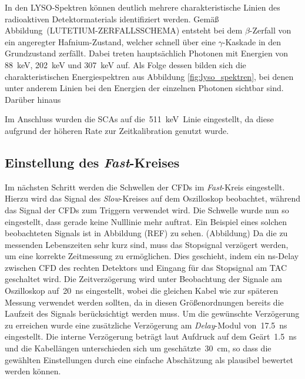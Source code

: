 \documentclass[11pt, a4paper]{article}
\numberwithin{equation}{section}
\newcommand{\korr}[1]{{\color{red}(#1)}}
\begin{document}
In den LYSO-Spektren können deutlich mehrere charakteristische Linien des radioaktiven Detektormaterials identifiziert werden.
Gemäß Abbildung~\korr{LUTETIUM-ZERFALLSSCHEMA} entsteht bei dem $\beta$-Zerfall von  ein angeregter Hafnium-Zustand, welcher schnell über eine $\gamma$-Kaskade in den Grundzustand zerfällt.
Dabei treten hauptsächlich Photonen mit Energien von \SI{88}{\keV}, \SI{202}{\keV} und \SI{307}{\keV} auf.
Als Folge dessen bilden sich die charakteristischen Energiespektren aus Abbildung \ref{fig:lyso_spektren}, bei denen unter anderem Linien bei den Energien der einzelnen Photonen sichtbar sind.
Darüber hinaus 





Im Anschluss wurden die SCAs auf die~\SI{511}{keV}~Linie eingestellt, da diese aufgrund der höheren Rate zur Zeitkalibration genutzt wurde.

\subsection{Einstellung des \textit{Fast}-Kreises}
\label{ssec:fastkreis}
Im nächsten Schritt werden die Schwellen der CFDs im \textit{Fast}-Kreis eingestellt.
Hierzu wird das Signal des \textit{Slow}-Kreises auf dem Oszilloskop beobachtet, während das Signal der CFDs zum Triggern verwendet wird.
Die Schwelle wurde nun so eingestellt, dass gerade keine Nulllinie mehr auftrat.
Ein Beispiel eines solchen beobachteten Signals ist in Abbildung \korr{REF} zu sehen.
\korr{Abbildung}
Da die zu messenden Lebenszeiten sehr kurz sind, muss das Stopsignal verzögert werden, um eine korrekte Zeitmessung zu ermöglichen.
Dies geschieht, indem ein \si{ns}-Delay zwischen CFD des rechten Detektors und Eingang für das Stopsignal am TAC geschaltet wird.
Die Zeitverzögerung wird unter Beobachtung der Signale am Oszilloskop auf~\SI{20}{ns} eingestellt, wobei die gleichen Kabel wie zur späteren Messung verwendet werden sollten, da in diesen Größenordnungen bereits die Laufzeit des Signals berücksichtigt werden muss.
Um die gewünschte Verzögerung zu erreichen wurde eine zusätzliche Verzögerung am \textit{Delay}-Modul von~\SI{17.5}{ns} eingestellt.
Die interne Verzögerung beträgt laut Aufdruck auf dem Geärt~\SI{1.5}{ns} und die Kabellängen unterschieden sich um geschätzte~\SI{30}{cm}, so dass die gewählten Einstellungen durch eine einfache Abschätzung als plausibel bewertet werden können.
\end{document}
